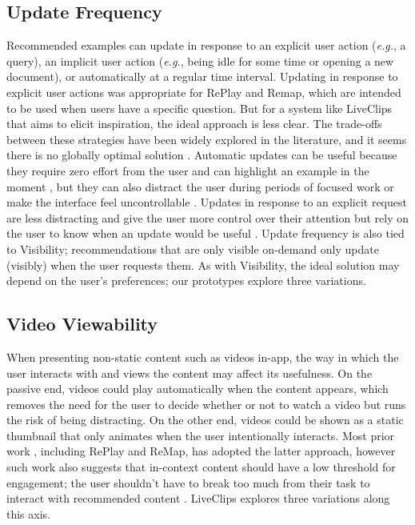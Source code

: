 \subsection{Update Frequency}
Recommended examples can update in response to an explicit user action (\textit{e.g.}, a query), an implicit user action (\textit{e.g.}, being idle for some time or opening a new document), or automatically at a regular time interval. Updating in response to explicit user actions was appropriate for RePlay and Remap, which are intended to be used when users have a specific question. But for a system like LiveClips that aims to elicit inspiration, the ideal approach is less clear. The trade-offs between these strategies have been widely explored in the literature, and it seems there is no globally optimal solution \cite{Rhodes1996, Chan2017, Siangliulue2015}. Automatic updates can be useful because they require zero effort from the user and can highlight an example in the moment \cite{Rhodes1996}, but they can also distract the user during periods of focused work \cite{Chan2017} or make the interface feel uncontrollable \cite{ODonovan2015}. Updates in response to an explicit request are less distracting and give the user more control over their attention but rely on the user to know when an update would be useful \cite{Rhodes1996, Siangliulue2015}. Update frequency is also tied to Visibility; recommendations that are only visible on-demand only update (visibly) when the user requests them. As with Visibility, the ideal solution may depend on the user's preferences; our prototypes explore three variations.

\subsection{Video Viewability}
When presenting non-static content such as videos in-app, the way in which the user interacts with and views the content may affect its usefulness. On the passive end, videos could play automatically when the content appears, which removes the need for the user to decide whether or not to watch a video but runs the risk of being distracting. On the other end, videos could be shown as a static thumbnail that only animates when the user intentionally interacts. Most prior work  \cite{Grossman2010a, Chi2012}, including RePlay and ReMap, has adopted the latter approach, however such work also suggests that in-context content should have a low threshold for engagement; the user shouldn't have to break too much from their task to interact with recommended content \cite{Grossman2010a}. LiveClips explores three variations along this axis.

